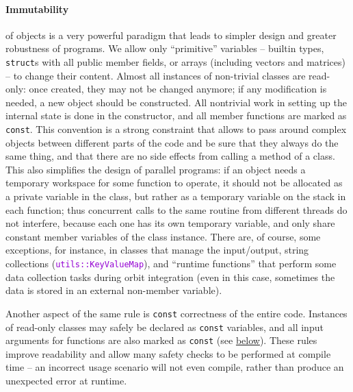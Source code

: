 \documentclass[12pt]{article}
\newcommand{\ttt}[1]{\textcolor{darkviolet}{\texttt{#1}}}
\let\oldparagraph\paragraph
\renewcommand{\paragraph}[1]{\vspace{-2mm}\oldparagraph{#1}}
\begin{document}
\paragraph{Immutability} \label{sec:Const}  of objects is a very powerful paradigm that leads to simpler design and greater robustness of programs. We allow only ``primitive'' variables -- builtin types, \texttt{struct}s with all public member fields, or arrays (including vectors and matrices) -- to change their content. Almost all instances of non-trivial classes are read-only: once created, they may not be changed anymore; if any modification is needed, a new object should be constructed. All nontrivial work in setting up the internal state is done in the constructor, and all member functions are marked as \texttt{const}. This convention is a strong constraint that allows to pass around complex objects between different parts of the code and be sure that they always do the same thing, and that there are no side effects from calling a method of a class. This also simplifies the design of parallel programs: if an object needs a temporary workspace for some function to operate, it should not be allocated as a private variable in the class, but rather as a temporary variable on the stack in each function; thus concurrent calls to the same routine from different threads do not interfere, because each one has its own temporary variable, and only share constant member variables of the class instance.
There are, of course, some exceptions, for instance, in classes that manage the input/output, string collections (\ttt{utils::KeyValueMap}), and ``runtime functions'' that perform some data collection tasks during orbit integration (even in this case, sometimes the data is stored in an external non-member variable).

Another aspect of the same rule is \texttt{const} correctness of the entire code. Instances of read-only classes may safely be declared as \texttt{const} variables, and all input arguments for functions are also marked as \texttt{const} (see \hyperref[sec:CallingConventions]{below}).
These rules improve readability and allow many safety checks to be performed at compile time -- an incorrect usage scenario will not even compile, rather than produce an unexpected error at runtime.
\end{document}
